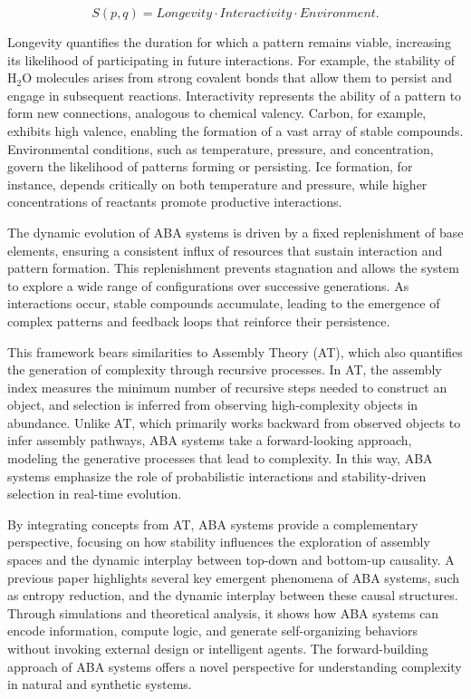 \documentclass[entropy,article,submit,pdftex,oneauthor]{Definitions/mdpi}
\begin{document}
\[
S(p, q) = Longevity \cdot Interactivity \cdot Environment.
\]

Longevity quantifies the duration for which a pattern remains viable, increasing its likelihood of participating in future interactions. For example, the stability of \( \text{H}_2\text{O} \) molecules arises from strong covalent bonds that allow them to persist and engage in subsequent reactions. Interactivity represents the ability of a pattern to form new connections, analogous to chemical valency. Carbon, for example, exhibits high valence, enabling the formation of a vast array of stable compounds. Environmental conditions, such as temperature, pressure, and concentration, govern the likelihood of patterns forming or persisting. Ice formation, for instance, depends critically on both temperature and pressure, while higher concentrations of reactants promote productive interactions.

The dynamic evolution of ABA systems is driven by a fixed replenishment of base elements, ensuring a consistent influx of resources that sustain interaction and pattern formation. This replenishment prevents stagnation and allows the system to explore a wide range of configurations over successive generations. As interactions occur, stable compounds accumulate, leading to the emergence of complex patterns and feedback loops that reinforce their persistence.

This framework bears similarities to Assembly Theory (AT), which also quantifies the generation of complexity through recursive processes. In AT, the assembly index measures the minimum number of recursive steps needed to construct an object, and selection is inferred from observing high-complexity objects in abundance. Unlike AT, which primarily works backward from observed objects to infer assembly pathways, ABA systems take a forward-looking approach, modeling the generative processes that lead to complexity. In this way, ABA systems emphasize the role of probabilistic interactions and stability-driven selection in real-time evolution.

By integrating concepts from AT, ABA systems provide a complementary perspective, focusing on how stability influences the exploration of assembly spaces and the dynamic interplay between top-down and bottom-up causality. A previous paper \cite{adler2024howinfoevolves} highlights several key emergent phenomena of ABA systems, such as entropy reduction, and the dynamic interplay between these causal structures. Through simulations and theoretical analysis, it shows how ABA systems can encode information, compute logic, and generate self-organizing behaviors without invoking external design or intelligent agents. The forward-building approach of ABA systems offers a novel perspective for understanding complexity in natural and synthetic systems.
\end{document}
